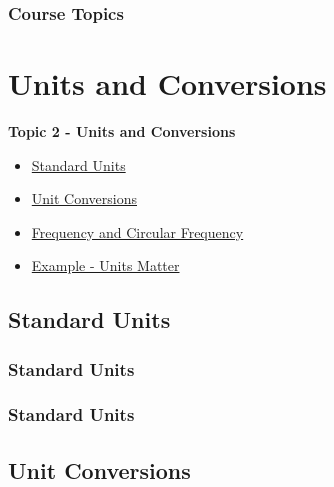 \documentclass[fleqn]{beamer} %
\newcommand{\sectionIItitle}{Units and Conversions}
\newcommand{\sectionIsubsectionIVtitle}{Course Topics}
\newcommand{\sectionIIsubsectionItitle}{Standard Units}
\newcommand{\sectionIIsubsectionIItitle}{Unit Conversions}
\newcommand{\sectionIIsubsectionIIItitle}{Frequency and Circular Frequency}
\newcommand{\sectionIIsubsectionIVtitle}{Example - Units Matter}
\newcommand{\btVFill}{\vskip0pt plus 1filll}
\begin{document}
			\begin{frame}
				\frametitle{\sectionIsubsectionIVtitle}
		

			\end{frame}

	
	\section{\sectionIItitle}\label{sectionII}

		\begin{frame}
			\large \textbf{Topic 2 - \sectionIItitle} \vspace{3mm}\\

			\begin{itemize}
				\item \hyperlink{sectionIIsubsectionI}{\sectionIIsubsectionItitle} \vspc %
				\item \hyperlink{sectionIIsubsectionII}{\sectionIIsubsectionIItitle} \vspc %
				\item \hyperlink{sectionIIsubsectionIII}{\sectionIIsubsectionIIItitle} \vspc %
				\item \hyperlink{sectionIIsubsectionIV}{\sectionIIsubsectionIVtitle} \vspc %
			\end{itemize}

		\end{frame}

		\subsection{\sectionIIsubsectionItitle}\label{sectionIIsubsectionI}

			\begin{frame}[label=sectionIIsubsectionI]
				\frametitle{\sectionIIsubsectionItitle}
		

			\end{frame}

		    \begin{frame}[label=sectionIIsubsectionI]
				\frametitle{\sectionIIsubsectionItitle}
		

			\end{frame}	

		\subsection{\sectionIIsubsectionIItitle}\label{sectionIIsubsectionII}
\end{document}
